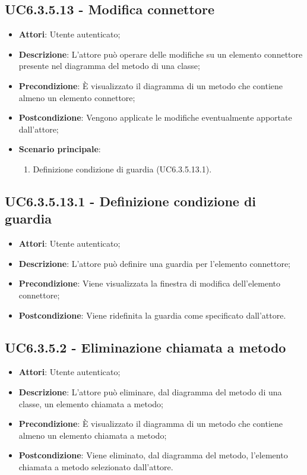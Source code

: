 \subsection{UC6.3.5.13 - Modifica connettore} 
\label{ssec:UC6.3.5.13} 
\begin{itemize} 
\item \textbf{Attori}: Utente autenticato;
\item \textbf{Descrizione}: L'attore può operare delle modifiche su un elemento connettore presente nel diagramma del metodo di una classe;
\item \textbf{Precondizione}: È visualizzato il diagramma di un metodo che contiene almeno un elemento connettore;
\item \textbf{Postcondizione}: Vengono applicate le modifiche eventualmente apportate dall'attore;
\item \textbf{Scenario principale}: \begin{enumerate}\item Definizione condizione di guardia (UC6.3.5.13.1). 
 \end{enumerate}
\end{itemize} 
\subsection{UC6.3.5.13.1 - Definizione condizione di guardia} 
\label{ssec:UC6.3.5.13.1} 
\begin{itemize} 
\item \textbf{Attori}: Utente autenticato;
\item \textbf{Descrizione}: L'attore può definire una guardia per l'elemento connettore;
\item \textbf{Precondizione}: Viene visualizzata la finestra di modifica dell'elemento connettore;
\item \textbf{Postcondizione}: Viene ridefinita la guardia come specificato dall'attore.
\end{itemize} 
\subsection{UC6.3.5.2 - Eliminazione chiamata a metodo} 
\label{ssec:UC6.3.5.2} 
\begin{itemize} 
\item \textbf{Attori}: Utente autenticato;
\item \textbf{Descrizione}: L'attore può eliminare, dal diagramma del metodo di una classe, un elemento chiamata a metodo;
\item \textbf{Precondizione}: È visualizzato il diagramma di un metodo che contiene almeno un elemento chiamata a metodo;
\item \textbf{Postcondizione}: Viene eliminato, dal diagramma del metodo,  l'elemento chiamata a metodo selezionato dall'attore.
\end{itemize} 

